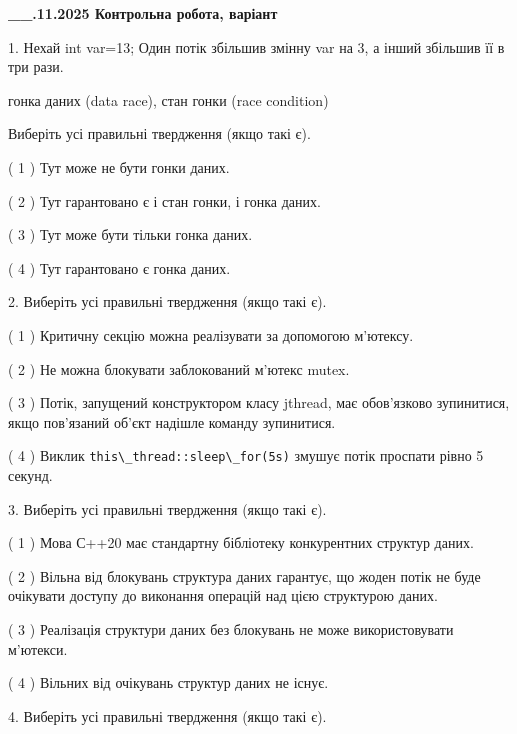 \documentclass[12pt, ukrainian]{article}
\def\code#1{\Verb!#1!}
\begin{document}
\newpage
\begin {large}

\textbf{\_\_.11.2025 Контрольна робота, варіант  }\par


{
1. Нехай int var=13; Один потік збільшив змінну var на 3, а інший збільшив її в три рази.

гонка даних (data race), стан гонки (race condition)

Виберіть усі правильні твердження (якщо такі є).\par
\vspace{2mm}
( 1 ) Тут може не бути гонки даних.%

( 2 ) Тут гарантовано є і стан гонки, і гонка даних.%

( 3 ) Тут може бути тільки гонка даних.%

( 4 ) Тут гарантовано є гонка даних.%


2. Виберіть усі правильні твердження (якщо такі є).\par
\vspace{2mm}

( 1 ) Критичну секцію можна реалізувати за допомогою м’ютексу.%

( 2 ) Не можна блокувати заблокований м’ютекс mutex.%

( 3 ) Потік, запущений конструктором класу jthread, має обов’язково зупинитися, якщо пов’язаний об’єкт надішле команду зупинитися.%

( 4 ) Виклик \code{this\_thread::sleep\_for(5s)} змушує потік проспати рівно 5 секунд.%


3. Виберіть усі правильні твердження (якщо такі є).\par
\vspace{2mm}

( 1 ) Мова С++20 має стандартну бібліотеку конкурентних структур даних.%

( 2 ) Вільна від блокувань структура даних гарантує, що жоден потік не буде очікувати доступу до виконання операцій над цією структурою даних.%

( 3 ) Реалізація структури даних без блокувань не може використовувати м’ютекси.%

( 4 ) Вільних від очікувань структур даних не існує.%


4. Виберіть усі правильні твердження (якщо такі є).\par
\vspace{2mm}

}
\end{large}
\end{document}
